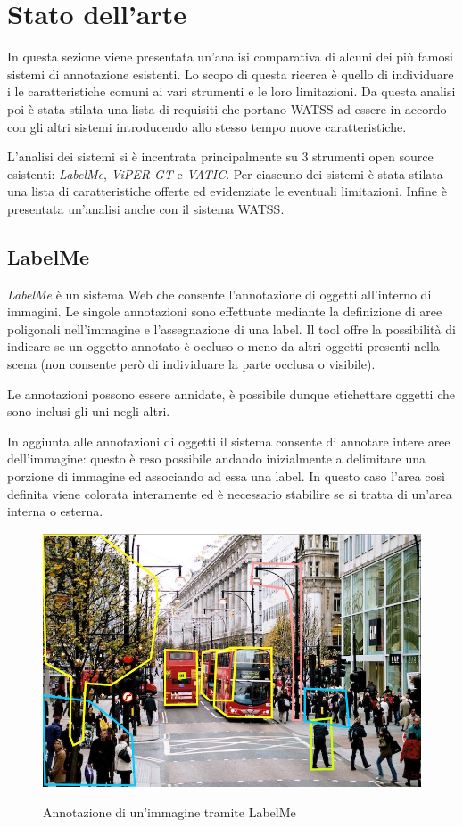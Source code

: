 \section{Stato dell'arte}
\label{ch:panoramica}

In questa sezione viene presentata un'analisi comparativa di alcuni dei più famosi sistemi di annotazione esistenti. Lo scopo di questa ricerca è quello di individuare i le caratteristiche comuni ai vari strumenti e le loro limitazioni. Da questa analisi poi è stata stilata una lista di requisiti che portano WATSS ad essere in accordo con gli altri sistemi introducendo allo stesso tempo nuove caratteristiche.

L'analisi dei sistemi si è incentrata principalmente su 3 strumenti open source esistenti: \emph{LabelMe}, \emph{ViPER-GT} e \emph{VATIC}. Per ciascuno dei sistemi è stata stilata una lista di caratteristiche offerte ed evidenziate le eventuali limitazioni. Infine è presentata un'analisi anche con il sistema WATSS.

\subsection{LabelMe}

\emph{LabelMe}\cite{Russell:2008:LDW:1345995.1345999} è un sistema Web che consente l'annotazione di oggetti all'interno di immagini. Le singole annotazioni sono effettuate mediante la definizione di aree poligonali nell'immagine e l'assegnazione di una label. Il tool offre la possibilità di indicare se un oggetto annotato è occluso o meno da altri oggetti presenti nella scena (non consente però di individuare la parte occlusa o visibile).

Le annotazioni possono essere annidate, è possibile dunque etichettare oggetti che sono inclusi gli uni negli altri. 

In aggiunta alle annotazioni di oggetti il sistema consente di annotare intere aree dell'immagine: questo è reso possibile andando inizialmente a delimitare una porzione di immagine ed associando ad essa una label. In questo caso l'area così definita viene colorata interamente ed è necessario stabilire se si tratta di un'area interna o esterna.

\begin{figure}[H]
\centering
\includegraphics[width=0.6\linewidth]{images/labelme.jpg}
  \label{fig:labelme}
  \caption{Annotazione di un'immagine tramite LabelMe}
\end{figure}


